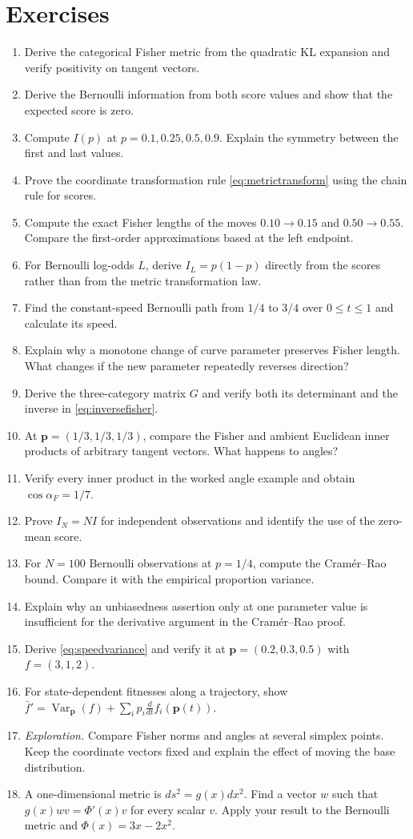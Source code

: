 \documentclass[11pt,oneside,openany]{book}
\theoremstyle{definition}
\theoremstyle{remark}
\newenvironment{exercises}{\begin{enumerate}[label=\thechapter.\arabic*,ref=\thechapter.\arabic*,leftmargin=2.8em,itemsep=6pt]}{\end{enumerate}}
\newcommand{\Var}{\operatorname{Var}}
\newcommand{\p}{\mathbf{p}}
\numberwithin{equation}{chapter}
\begin{document}
\section{Exercises}
\begin{exercises}
\item Derive the categorical Fisher metric from the quadratic KL expansion and verify positivity on tangent vectors.
\item Derive the Bernoulli information from both score values and show that the expected score is zero.
\item Compute $I(p)$ at $p=0.1,0.25,0.5,0.9$. Explain the symmetry between the first and last values.
\item Prove the coordinate transformation rule \eqref{eq:metrictransform} using the chain rule for scores.
\item Compute the exact Fisher lengths of the moves $0.10\to0.15$ and $0.50\to0.55$. Compare the first-order approximations based at the left endpoint.
\item For Bernoulli log-odds $L$, derive $I_L=p(1-p)$ directly from the scores rather than from the metric transformation law.
\item Find the constant-speed Bernoulli path from $1/4$ to $3/4$ over $0\leq t\leq1$ and calculate its speed.
\item Explain why a monotone change of curve parameter preserves Fisher length. What changes if the new parameter repeatedly reverses direction?
\item Derive the three-category matrix $G$ and verify both its determinant and the inverse in \eqref{eq:inversefisher}.
\item At $\p=(1/3,1/3,1/3)$, compare the Fisher and ambient Euclidean inner products of arbitrary tangent vectors. What happens to angles?
\item Verify every inner product in the worked angle example and obtain $\cos\alpha_F=1/7$.
\item Prove $I_N=NI$ for independent observations and identify the use of the zero-mean score.
\item For $N=100$ Bernoulli observations at $p=1/4$, compute the Cram\'er--Rao bound. Compare it with the empirical proportion variance.
\item Explain why an unbiasedness assertion only at one parameter value is insufficient for the derivative argument in the Cram\'er--Rao proof.
\item Derive \eqref{eq:speedvariance} and verify it at $\p=(0.2,0.3,0.5)$ with $f=(3,1,2)$.
\item For state-dependent fitnesses along a trajectory, show $\bar f'=\Var_\p(f)+\sum_i p_i\frac{d}{dt}f_i(\p(t))$.
\item \emph{Exploration.} Compare Fisher norms and angles at several simplex points. Keep the coordinate vectors fixed and explain the effect of moving the base distribution.
\item A one-dimensional metric is $ds^2=g(x)dx^2$. Find a vector $w$ such that $g(x)wv=\Phi'(x)v$ for every scalar $v$. Apply your result to the Bernoulli metric and $\Phi(x)=3x-2x^2$.
\end{exercises}
\end{document}
